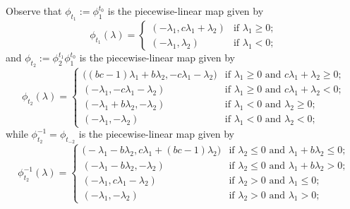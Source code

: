 \documentclass{amsart}
\numberwithin{theorem}{section}
\begin{document}
  Observe that $\phi_{t_1}:=\phi_1^{t_0}$ is the piecewise-linear map given by
  \begin{equation}
    \label{eq:forward mutation 1}
    \phi_{t_1}(\lambda)=\begin{cases} (-\lambda_1,c\lambda_1+\lambda_2) & \text{if $\lambda_1\ge0$;}\\ (-\lambda_1,\lambda_2) & \text{if $\lambda_1<0$;} \end{cases}
  \end{equation}
  and $\phi_{t_2}:=\phi_2^{t_1}\phi_1^{t_0}$ is the piecewise-linear map given by
  \begin{equation}
    \label{eq:forward two step mutation}
    \phi_{t_2}(\lambda)=\begin{cases} \big((bc-1)\lambda_1+b\lambda_2, -c\lambda_1-\lambda_2\big) & \text{if $\lambda_1\ge 0$ and $c\lambda_1+\lambda_2\ge 0$;}\\ (-\lambda_1, -c\lambda_1-\lambda_2) & \text{if $\lambda_1\ge 0$ and $c\lambda_1+\lambda_2<0$;}\\ (-\lambda_1+b\lambda_2, -\lambda_2) & \text{if $\lambda_1<0$ and $\lambda_2\ge 0$;}\\ (-\lambda_1,-\lambda_2) & \text{if $\lambda_1<0$ and $\lambda_2<0$;}\end{cases}
  \end{equation}
  while $\phi_{t_2}^{-1}=\phi_{t_{-2}}$ is the piecewise-linear map given by
  \begin{equation}
    \label{eq:backward two step mutation}
    \phi_{t_2}^{-1}(\lambda)=\begin{cases} \big(-\lambda_1-b\lambda_2, c\lambda_1+(bc-1)\lambda_2\big) & \text{if $\lambda_2\le 0$ and $\lambda_1+b\lambda_2\le 0$;}\\ (-\lambda_1-b\lambda_2, -\lambda_2) & \text{if $\lambda_2\le 0$ and $\lambda_1+b\lambda_2>0$;}\\ (-\lambda_1, c\lambda_1-\lambda_2) & \text{if $\lambda_2>0$ and $\lambda_1\le 0$;}\\ (-\lambda_1,-\lambda_2) & \text{if $\lambda_2>0$ and $\lambda_1>0$;}\end{cases}
  \end{equation}
\end{document}
